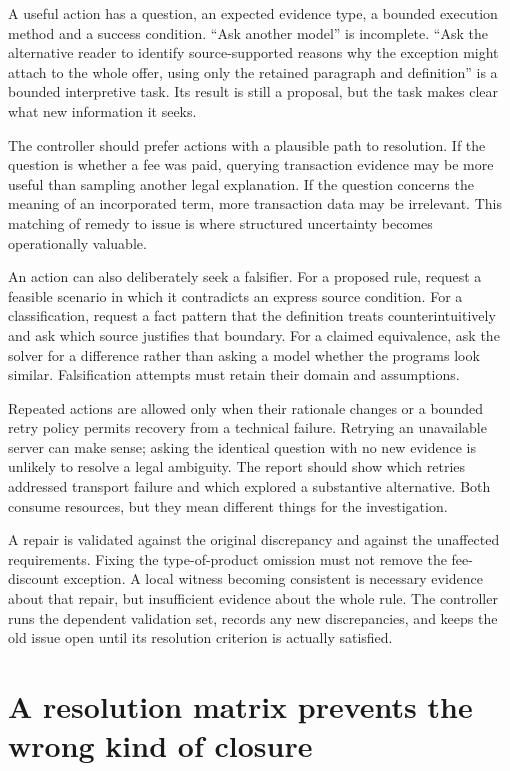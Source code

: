 \documentclass[12pt,a4paper,oneside,openany]{book}
\begin{document}
A useful action has a question, an expected evidence type, a bounded execution
method and a success condition. ``Ask another model'' is incomplete. ``Ask the
alternative reader to identify source-supported reasons why the exception might
attach to the whole offer, using only the retained paragraph and definition'' is
a bounded interpretive task. Its result is still a proposal, but the task makes
clear what new information it seeks.

The controller should prefer actions with a plausible path to resolution. If the
question is whether a fee was paid, querying transaction evidence may be more
useful than sampling another legal explanation. If the question concerns the
meaning of an incorporated term, more transaction data may be irrelevant. This
matching of remedy to issue is where structured uncertainty becomes operationally
valuable.

An action can also deliberately seek a falsifier. For a proposed rule, request a
feasible scenario in which it contradicts an express source condition. For a
classification, request a fact pattern that the definition treats counterintuitively
and ask which source justifies that boundary. For a claimed equivalence, ask the
solver for a difference rather than asking a model whether the programs look
similar. Falsification attempts must retain their domain and assumptions.

Repeated actions are allowed only when their rationale changes or a bounded retry
policy permits recovery from a technical failure. Retrying an unavailable server
can make sense; asking the identical question with no new evidence is unlikely
to resolve a legal ambiguity. The report should show which retries addressed
transport failure and which explored a substantive alternative. Both consume
resources, but they mean different things for the investigation.

A repair is validated against the original discrepancy and against the unaffected
requirements. Fixing the type-of-product omission must not remove the fee-discount
exception. A local witness becoming consistent is necessary evidence about that
repair, but insufficient evidence about the whole rule. The controller runs the
dependent validation set, records any new discrepancies, and keeps the old issue
open until its resolution criterion is actually satisfied.

\section{A resolution matrix prevents the wrong kind of closure}
\end{document}
